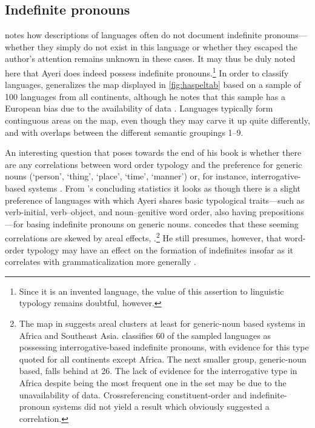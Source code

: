 
\subsection{Indefinite pronouns}
\label{subsec:indefpro}

\citet[56]{haspelmath1997} notes how descriptions of languages often do not
document indefinite pronouns---whether they simply do not exist in this
language or whether they escaped the author's attention remains unknown in
these cases. It may thus be duly noted here that Ayeri does indeed possess
indefinite pronouns.\footnote{Since it is an invented language, the value of
this assertion to linguistic typology remains doubtful, however.} In order to
classify languages, \citet{haspelmath1997} generalizes the map displayed in
\autoref{fig:haspeltab} based on a sample of 100 languages from all continents,
although he notes that this sample has a European bias due to the availability
of data \citep[2]{haspelmath1997}. Languages typically form continguous areas
on the map, even though they may carve it up quite differently, and with
overlaps between the different semantic groupings 1--9.

An interesting question that \citet{haspelmath1997} poses towards the end of
his book is whether there are any correlations between word order typology and
the preference for generic nouns (`person', `thing', `place', `time', `manner')
or, for instance, interrogative-based systems \citep[239--241]{haspelmath1997}.
From \citet{haspelmath1997}'s concluding statistics it looks as though there is
a slight preference of languages with which Ayeri shares basic typological
traits---such as verb-initial, verb--object, and noun--genitive word order,
also having prepositions---for basing indefinite pronouns on generic nouns.
\citet{haspelmath1997} concedes that these seeming correlations are skewed by
areal effects, .\footnote{The map in 
\citep{wals46A} suggests areal clusters at least for generic-noun based systems
in Africa and Southeast Asia.  classifies 60\pct{} of the
sampled languages as possessing interrogative-based indefinite pronouns, with
evidence for this type quoted for all continents except Africa. The next
smaller group, generic-noun based, falls behind at 26\pct. The lack of evidence
for the interrogative type in Africa despite being the most frequent one in the
set may be due to the unavailability of data. Crossreferencing
constituent-order and indefinite-pronoun systems did not yield a result which
obviously suggested a correlation.} He still presumes, however, that word-order
typology may have an effect on the formation of indefinites insofar as it
correlates with grammaticalization more generally \citep[239]{haspelmath1997}.


